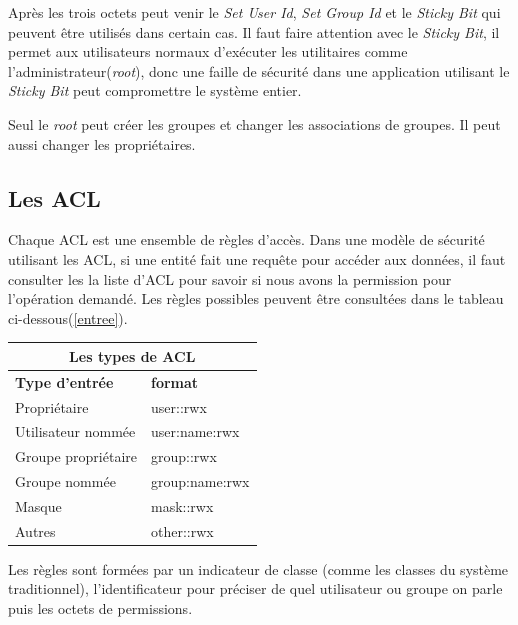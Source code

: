Après les trois octets peut venir le \emph{Set User Id}, \emph{Set Group Id} et le \emph{Sticky Bit} qui peuvent être utilisés dans certain cas. Il faut faire attention avec le \emph{Sticky Bit}, il permet aux utilisateurs normaux d'exécuter les utilitaires comme l'administrateur(\emph{root}), donc une faille de sécurité dans une application utilisant le \emph{Sticky Bit} peut compromettre le système entier.
 
Seul le \emph{root} peut créer les groupes et changer les associations de groupes. Il peut aussi changer les propriétaires.
 
\subsection*{Les ACL}
 
Chaque ACL est une ensemble de règles d'accès. Dans une modèle de sécurité utilisant les ACL, si une entité fait une requête pour accéder aux données, il faut consulter les la liste d'ACL pour savoir si nous avons la permission pour l'opération demandé. Les règles possibles peuvent être consultées dans le tableau ci-dessous(\ref{entree}).

\begin{center}
\begin{tabular}{|l|l|}
  \hline
    \multicolumn{2}{|c|}{Les types de ACL} \\
  \hline
\textbf{Type d'entrée} & \textbf{format} \\
  \hline
Propriétaire & user::rwx \\
Utilisateur nommée & user:name:rwx \\
Groupe propriétaire & group::rwx \\
Groupe nommée & group:name:rwx \\
Masque & mask::rwx \\
Autres & other::rwx \\
  \hline
\end{tabular}
\label{tab:entree}
\end{center}
 
Les règles sont formées par un indicateur de classe (comme les classes du système traditionnel), l'identificateur pour préciser de quel utilisateur ou groupe on parle puis les octets de permissions.
 
